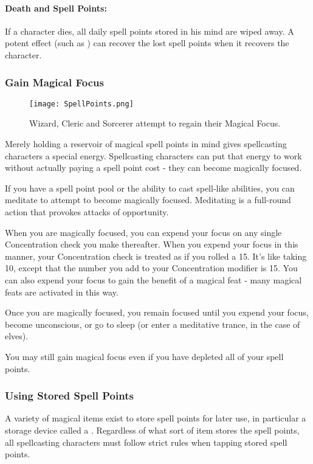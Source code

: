 \documentclass[../VancianToPsionics.tex]{subfiles}
\begin{document}
\paragraph{Death and Spell Points:} If a character dies, all daily spell points stored in his mind are wiped away. A potent effect (such as ) can recover the lost spell points when it recovers the character.

\subsubsection[Magical Focus]{Gain Magical Focus}

\begin{figure*}
  \caption{Wizard, Cleric and Sorcerer attempt to regain their Magical Focus.}
  \centering
    \texttt{[image: SpellPoints.png]}
\end{figure*}

\label{sec:MagicFocus}
Merely holding a reservoir of magical spell points in mind gives spellcasting characters a special energy. Spellcasting characters can put that energy to work without actually paying a spell point cost - they can become magically focused.

If you have a spell point pool or the ability to cast spell-like abilities, you can meditate to attempt to become magically focused. Meditating is a full-round action that provokes attacks of opportunity. 

When you are magically focused, you can expend your focus on any single Concentration check you make thereafter. When you expend your focus in this manner, your Concentration check is treated as if you rolled a 15. It's like taking 10, except that the number you add to your Concentration modifier is 15. You can also expend your focus to gain the benefit of a magical feat - many magical feats are activated in this way.

Once you are magically focused, you remain focused until you expend your focus, become unconscious, or go to sleep (or enter a meditative trance, in the case of elves).

You may still gain magical focus even if you have depleted all of your spell points.

\subsubsection{Using Stored Spell Points}
\label{sec:UsingStoredSpellPoints}
A variety of magical items exist to store spell points for later use, in particular a storage device called a . Regardless of what sort of item stores the spell points, all spellcasting characters must follow strict rules when tapping stored spell points.
\end{document}
